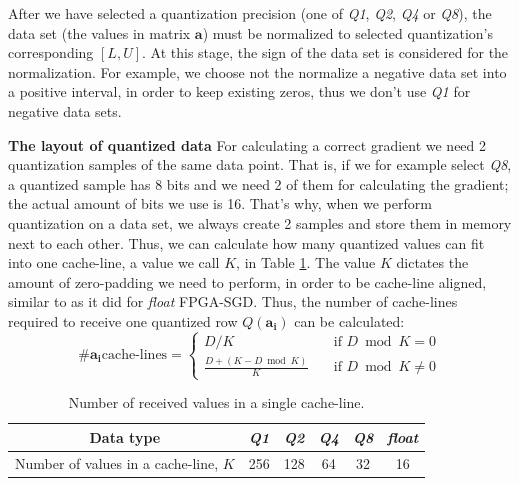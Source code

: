 \documentclass{article}
\begin{document}
After we have selected a quantization precision (one of \textit{Q1}, \textit{Q2}, \textit{Q4} or \textit{Q8}), the data set (the values in matrix $\mathbf{a}$) must be normalized to selected quantization's corresponding $[L,U]$. At this stage, the sign of the data set is considered for the normalization. For example, we choose not the normalize a negative data set into a positive interval, in order to keep existing zeros, thus we don't use \textit{Q1} for negative data sets.

\noindent
\textbf{The layout of quantized data}  For calculating a correct gradient we need 2 quantization samples of the same data point. That is, if we for example select \textit{Q8}, a quantized sample has 8 bits and we need 2 of them for calculating the gradient; the actual amount of bits we use is 16. That's why, when we perform quantization on a data set, we always create 2 samples and store them in memory next to each other. Thus, we can calculate how many quantized values can fit into one cache-line, a value we call $K$, in Table \ref{table:valuesincl}. The value $K$ dictates the amount of zero-padding we need to perform, in order to be cache-line aligned, similar to as it did for \textit{float} FPGA-SGD. Thus, the number of cache-lines required to receive one quantized row $Q(\mathbf{a_i})$ can be calculated:
\begin{equation}
\label{equation:cachelines}
\text{\#} \mathbf{a_i} \text{cache-lines} = 
\begin{cases}
D/K
\quad & \text{if } D\bmod K=0 \\
\frac{D + (K-D\bmod K)}{K}
\quad & \text{if } D\bmod K\neq0
\end{cases}
\end{equation}
\begin{table}[t]
\centering
\caption{Number of received values in a single cache-line.}
\label{table:valuesincl}
\begin{tabular}{c|c|c|c|c|c}
Data type & \textit{Q1} & \textit{Q2} & \textit{Q4} & \textit{Q8} & \textit{float}\\
\hline
Number of values in a cache-line, $K$ & 256 & 128 & 64 & 32 & 16\\
\end{tabular}
\end{table}
\end{document}
